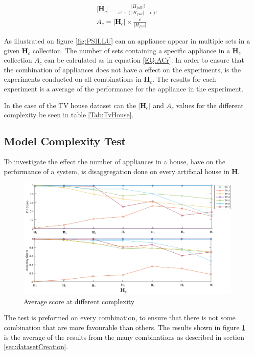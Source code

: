 \begin{gather}
		|\textbf{H}_c| = \frac{|H_{full}|!}{c! \times (|H_{full}| - c)!} \label{EQ:nCr} \\
		A_c = |\textbf{H}_c| \times \frac{c}{|H_{full}|} \label{EQ:ACr}
\end{gather}


As illustrated on figure \ref{fig:PSILLU} can an appliance appear in multiple sets in a given $\textbf{H}_c$ collection. The number of sets containing a specific appliance in a $\textbf{H}_c$ collection $A_c$ can be calculated as in equation \ref{EQ:ACr}. In order to ensure that the combination of appliances does not have a effect on the experiments, is the experiments conducted on all combinations in $\textbf{H}_c$. The results for each experiment is a average of the performance for the appliance in the experiment. 



In the case of the TV house dataset can the $|\textbf{H}_c|$ and $A_c$ values for the different complexity be seen in table \ref{Tab:TvHouse}.


\subsection{Model Complexity Test}
\label{sec:MCT}
To investigate the effect the number of appliances in a house, have on the performance of a  system, is disaggregation done on every artificial house in $\textbf{H}$.

\begin{figure}[H]
\centering
\includegraphics[width=1\textwidth]{billeder/ModelSize.png}
\caption{Average score at different complexity }
\label{fig:COMPT}
\end{figure}

The test is preformed on every combination, to ensure that there is not some combination that are more favourable than others. The results shown in figure \ref{fig:COMPT} is the average of the results from the many combinations as described in section \ref{sec:datasetCreation}. 

